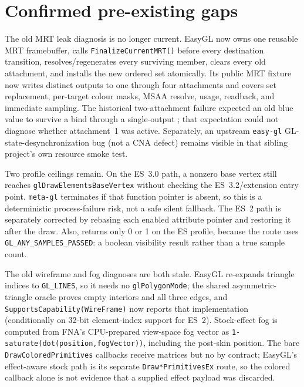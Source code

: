 \section{Confirmed pre-existing gaps}

The old MRT leak diagnosis is no longer current. EasyGL now owns one reusable MRT framebuffer,
calls \texttt{FinalizeCurrentMRT()} before every destination transition, resolves/regenerates every
surviving member, clears every old attachment, and installs the new ordered set atomically. Its
public MRT fixture now writes distinct outputs to one through four attachments and covers set
replacement, per-target colour masks, MSAA resolve, usage, readback, and immediate sampling. The
historical two-attachment failure expected an old blue value to survive a
 bind through a single-output ; that expectation
could not diagnose whether attachment~1 was active. Separately, an upstream \texttt{easy-gl}
GL-state-desynchronization bug (not a CNA defect) remains visible in that sibling project's own
resource smoke test.

Two profile ceilings remain. On the ES~3.0 path, a nonzero base vertex still reaches
\texttt{glDrawElementsBaseVertex} without checking the ES~3.2/extension entry point. \texttt{meta-gl}
terminates if that function pointer is absent, so this is a deterministic process-failure risk,
not a safe silent fallback. The ES~2 path is separately corrected by rebasing each enabled
attribute pointer and restoring it after the draw. Also,
 returns only 0 or 1 on the ES profile, because the route
uses \texttt{GL\_ANY\_SAMPLES\_PASSED}: a boolean visibility result rather than a true sample
count.

The old wireframe and fog diagnoses are both stale. EasyGL re-expands triangle indices to
\texttt{GL\_LINES}, so it needs no \texttt{glPolygonMode}; the shared asymmetric-triangle oracle
proves empty interiors and all three edges, and \texttt{SupportsCapability(WireFrame)} now reports
that implementation (conditionally on 32-bit element-index support for ES~2). Stock-effect fog is
computed from FNA's CPU-prepared view-space fog vector as
\texttt{1-saturate(dot(position,fogVector))}, including the post-skin position. The bare
\texttt{DrawColoredPrimitives} callbacks receive matrices but no  by
contract; EasyGL's effect-aware stock path is its separate \texttt{Draw*PrimitivesEx} route, so the
colored callback alone is not evidence that a supplied effect payload was discarded.

